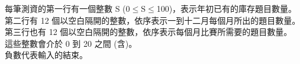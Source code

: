每筆測資的第一行有一個整數 S (0$\leq$S$\leq$100)，表示年初已有的庫存題目數量。\\
第二行有 12 個以空白隔開的整數，依序表示一到十二月每個月所出的題目數量。\\
第三行也有 12 個以空白隔開的整數，依序表示每個月比賽所需要的題目數量。\\
這些整數會介於 0 到 20 之間 (含)。\\
負數代表輸入的結束。\\
